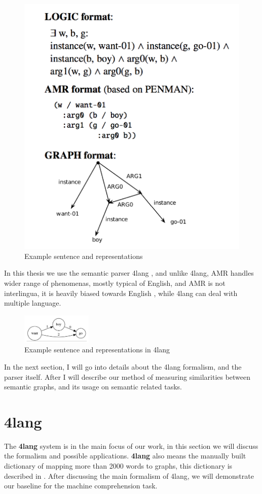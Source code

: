 \begin{figure}[h!]
	\centering
	\includegraphics[height=0.4\textwidth]{figures/amr}
	\caption{Example sentence and representations}
	\label{fig:amr}
\end{figure}

In this thesis we use the semantic parser 4lang \cite{Recski:2015b}, and unlike 4lang, AMR handles wider range of phenomenas, mostly typical of English, and AMR is not interlingua, it is heavily biased towards English \cite{Palmer:2005}, while 4lang can deal with multiple language.

\begin{figure}[h!]
	\centering
	\includegraphics[width=0.3\textwidth]{figures/4langboy}
	\caption{Example sentence and representations in 4lang}
	\label{fig:4langboy}
\end{figure}

In the next section, I will go into details about the 4lang formalism, and the parser itself. After I will describe our method of measuring similarities between semantic graphs, and its usage on semantic related tasks.

\section{4lang}
\label{sec:4lang}
The \textbf{4lang} system is in the main focus of our work, in this section we will discuss the formalism and possible applications. \textbf{4lang} also means the manually built dictionary of mapping more than 2000 words to graphs, this dictionary is described in \cite{Kornai:2013}. After discussing the main formalism of 4lang, we will demonstrate our baseline for the machine comprehension task.

